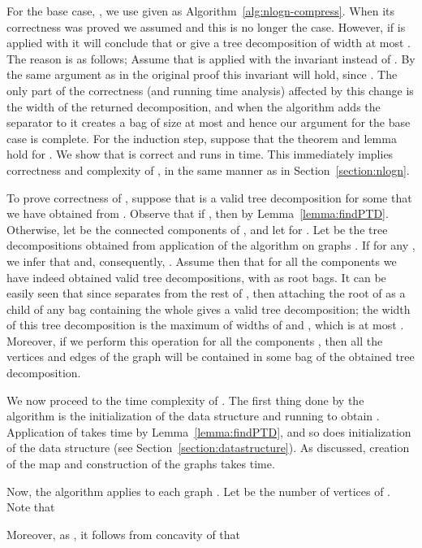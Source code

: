 \documentclass[a4paper,11pt]{article}
\theoremstyle{definition}
\theoremstyle{remark}
\begin{document}
For the base case, , we use  given as
Algorithm~\ref{alg:nlogn-compress}.  When its correctness was proved
we assumed  and this is no longer the case.  However,
if  is applied with  it will conclude that
 or give a tree decomposition of width at most .
The reason is as follows; Assume that  is applied with the
invariant  instead of .  By the same argument as
in the original proof this invariant will hold, since
.  The only part of the correctness
(and running time analysis) affected by this change is the width of
the returned decomposition, and when the algorithm adds the separator
to  it creates a bag of size at most  and
hence our argument for the base case is complete.  For the induction
step, suppose that the theorem and lemma hold for .  We
show that  is correct and runs in  time.  This immediately implies correctness and
complexity of , in the same manner as in
Section~\ref{section:nlogn}.





To prove correctness of , suppose that  is a
valid tree decomposition for some  that we have
obtained from .  Observe that if , then  by Lemma~\ref{lemma:findPTD}.  Otherwise, let 
be the connected components of , and let  for .  Let  be the tree decompositions
obtained from application of the algorithm  on graphs
.  If  for any , we infer that  and,
consequently, .  Assume then that for all the components we
have indeed obtained valid tree decompositions, with  as root
bags.  It can be easily seen that since  separates  from
the rest of , then attaching the root of  as a child of any
bag containing the whole  gives a valid tree decomposition;
the width of this tree decomposition is the maximum of widths of
 and , which is at most .  Moreover, if we perform
this operation for all the components , then all the vertices and
edges of the graph will be contained in some bag of the obtained tree
decomposition.

We now proceed to the time complexity of .  The
first thing done by the algorithm is the initialization of the data
structure and running  to obtain .  Application of
 takes  time by Lemma~\ref{lemma:findPTD}, and so
does initialization of the data structure (see
Section~\ref{section:datastructure}).  As discussed, creation of the
 map and construction of the graphs  takes
 time.



Now, the algorithm applies  to each graph .  Let
 be the number of vertices of .  Note that

Moreover, as , it follows from concavity of  that
\end{document}
